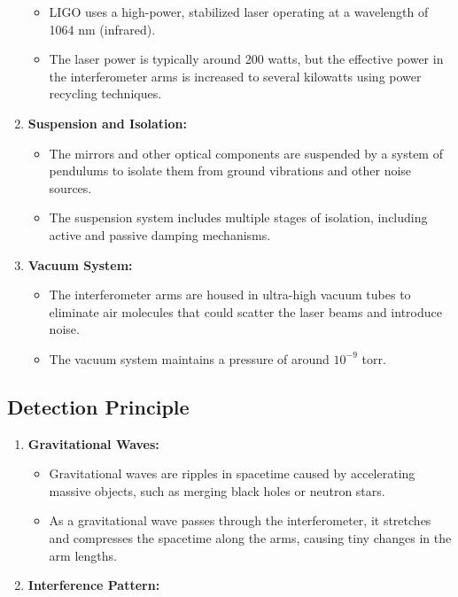 \documentclass[
  a4paper,
]{book}
\providecommand{\tightlist}{%
  \setlength{\itemsep}{0pt}\setlength{\parskip}{0pt}}
\begin{document}
\begin{tcolorbox}
\begin{enumerate}
  \begin{itemize}
  \tightlist
  \item
    LIGO uses a high-power, stabilized laser operating at a wavelength
    of 1064 nm (infrared).
  \item
    The laser power is typically around 200 watts, but the effective
    power in the interferometer arms is increased to several kilowatts
    using power recycling techniques.
  \end{itemize}
\item
  \textbf{Suspension and Isolation:}

  \begin{itemize}
  \tightlist
  \item
    The mirrors and other optical components are suspended by a system
    of pendulums to isolate them from ground vibrations and other noise
    sources.
  \item
    The suspension system includes multiple stages of isolation,
    including active and passive damping mechanisms.
  \end{itemize}
\item
  \textbf{Vacuum System:}

  \begin{itemize}
  \tightlist
  \item
    The interferometer arms are housed in ultra-high vacuum tubes to
    eliminate air molecules that could scatter the laser beams and
    introduce noise.
  \item
    The vacuum system maintains a pressure of around \(10^{-9}\) torr.
  \end{itemize}
\end{enumerate}

\subsection{Detection Principle}\label{detection-principle}

\begin{enumerate}
\def\labelenumi{\arabic{enumi}.}
\tightlist
\item
  \textbf{Gravitational Waves:}

  \begin{itemize}
  \tightlist
  \item
    Gravitational waves are ripples in spacetime caused by accelerating
    massive objects, such as merging black holes or neutron stars.
  \item
    As a gravitational wave passes through the interferometer, it
    stretches and compresses the spacetime along the arms, causing tiny
    changes in the arm lengths.
  \end{itemize}
\item
  \textbf{Interference Pattern:}


\end{enumerate}
\end{tcolorbox}
\end{document}
